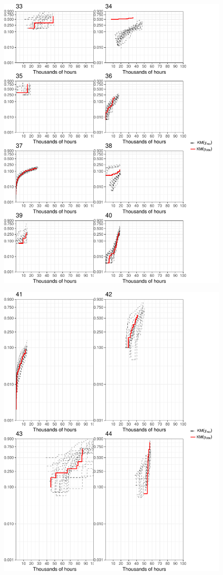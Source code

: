 \documentclass[12pt]{article}
\begin{document}
\begin{figure}[H]
\includegraphics[width=\textwidth]{ppcheck-5.pdf}
\end{figure}
\begin{figure}[H]
\includegraphics[width=\textwidth]{ppcheck-6.pdf}
\end{figure}
\clearpage
% 


\end{document}
